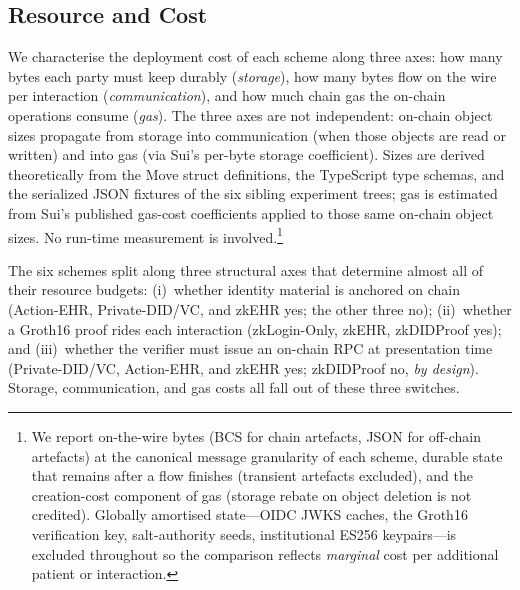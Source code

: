 %
%
%

\subsection{Resource and Cost}
\label{ssub:resource-and-cost}

We characterise the deployment cost of each scheme along three axes:
how many bytes each party must keep durably (\emph{storage}), how many
bytes flow on the wire per interaction (\emph{communication}), and how
much chain gas the on-chain operations consume (\emph{gas}). The three
axes are not independent: on-chain object sizes propagate from storage
into communication (when those objects are read or written) and into gas
(via Sui's per-byte storage coefficient). Sizes are derived theoretically
from the Move struct definitions, the TypeScript type schemas, and the
serialized JSON fixtures of the six sibling experiment trees; gas is
estimated from Sui's published gas-cost coefficients applied to those same
on-chain object sizes. No run-time measurement is involved.\footnote{We
report on-the-wire bytes (BCS for chain artefacts, JSON for off-chain
artefacts) at the canonical message granularity of each scheme, durable
state that remains after a flow finishes (transient artefacts excluded),
and the creation-cost component of gas (storage rebate on object deletion
is not credited). Globally amortised state---OIDC JWKS caches, the
Groth16 verification key, salt-authority seeds, institutional ES256
keypairs---is excluded throughout so the comparison reflects \emph{marginal}
cost per additional patient or interaction.}

The six schemes split along three structural axes that determine almost
all of their resource budgets: (i)~whether identity material is anchored
on chain (Action-EHR, Private-DID/VC, and \textsf{zkEHR} yes; the other
three no); (ii)~whether a Groth16 proof rides each interaction
(zkLogin-Only, \textsf{zkEHR}, \textsf{zkDIDProof} yes); and (iii)~whether
the verifier must issue an on-chain RPC at presentation time
(Private-DID/VC, Action-EHR, and \textsf{zkEHR} yes; \textsf{zkDIDProof}
no, \emph{by design}). Storage, communication, and gas costs all fall
out of these three switches.

